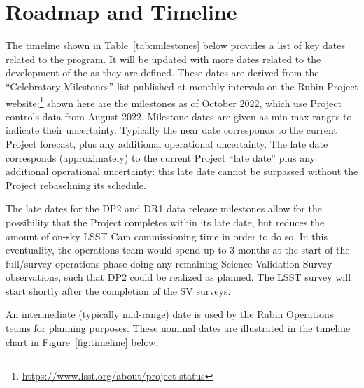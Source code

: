 \section{Roadmap and Timeline} \label{sec:timeline}


The timeline shown in Table~\ref{tab:milestones} below provides a list of key dates related to the \es program.
It will be updated with more dates related to the development of the \esp as they are defined.
These dates are derived from the ``Celebratory Milestones'' list published at monthly intervals on the Rubin Project website;\footnote{\url{https://www.lsst.org/about/project-status}} shown here are the milestones as of October 2022, which use Project controls data from August 2022.
Milestone dates are given as min-max ranges to indicate their uncertainty.
Typically the near date corresponds to the current Project forecast, plus any additional operational uncertainty.
The late date corresponds (approximately) to the current Project ``late date'' plus any additional operational uncertainty: this late date cannot be surpassed without the Project rebaselining its schedule.

The late dates for the DP2 and DR1 data release milestones allow for the possibility that the Project completes within its late date, but reduces the amount of on-sky LSST Cam commissioning time in order to do so.
In this eventuality, the operations team would spend up to 3 months at the start of the full/survey operations phase doing any remaining Science Validation Survey observations, such that DP2 could be realized as planned.
The LSST survey will start shortly after the completion of the SV surveys.

An intermediate (typically mid-range) date is used by the Rubin Operations teams for planning purposes. These nominal dates are illustrated in the timeline chart in Figure~\ref{fig:timeline} below.

